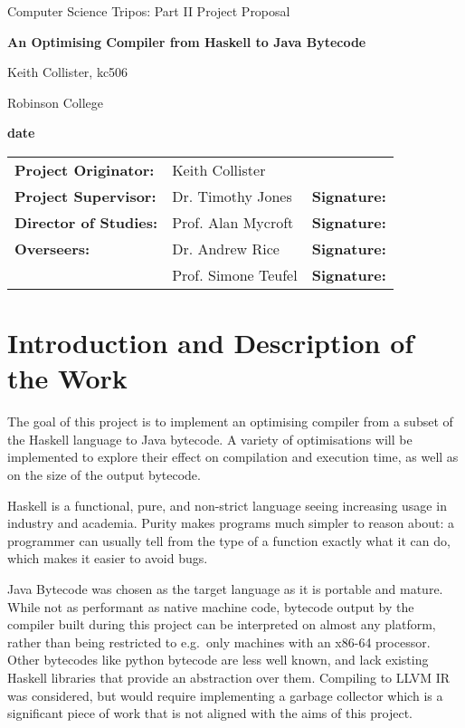 \documentclass[12pt]{article}
\begin{document}
\thispagestyle{empty}

\centerline{\large Computer Science Tripos: Part II Project Proposal}
\vspace{0.4in}
\centerline{\Large\bf An Optimising Compiler from Haskell to Java Bytecode}
\vspace{0.3in}

\centerline{Keith Collister, kc506}
\centerline{Robinson College}

\centerline{\large \textbf{date}}

\vspace{0.8in}

\begin{tabular}{ p{4cm} p{4.5cm} l }
{\bf Project Originator:} & Keith Collister & \\[3mm]
{\bf Project Supervisor:} & Dr. Timothy Jones & {\bf Signature:} \\[3mm]
{\bf Director of Studies:} & Prof. Alan Mycroft & {\bf Signature:} \\[3mm]
{\bf Overseers:} & Dr. Andrew Rice & {\bf Signature:} \\[3mm]
                 & Prof. Simone Teufel & {\bf Signature:} \\[3mm]
\end{tabular}

\vspace{0.3in}


\section*{Introduction and Description of the Work}

The goal of this project is to implement an optimising compiler from a subset of the Haskell language to Java bytecode.
A variety of optimisations will be implemented to explore their effect on compilation and execution time, as well as on
the size of the output bytecode.

Haskell is a functional, pure, and non-strict language seeing increasing usage in industry and academia. Purity makes
programs much simpler to reason about: a programmer can usually tell from the type of a function exactly what it can do,
which makes it easier to avoid bugs.

Java Bytecode was chosen as the target language as it is portable and mature. While not as performant as native machine
code, bytecode output by the compiler built during this project can be interpreted on almost any platform, rather than
being restricted to e.g.\ only machines with an x86-64 processor. Other bytecodes like python bytecode are less well
known, and lack existing Haskell libraries that provide an abstraction over them. Compiling to LLVM IR was considered,
but would require implementing a garbage collector which is a significant piece of work that is not aligned with the
aims of this project.
\end{document}
